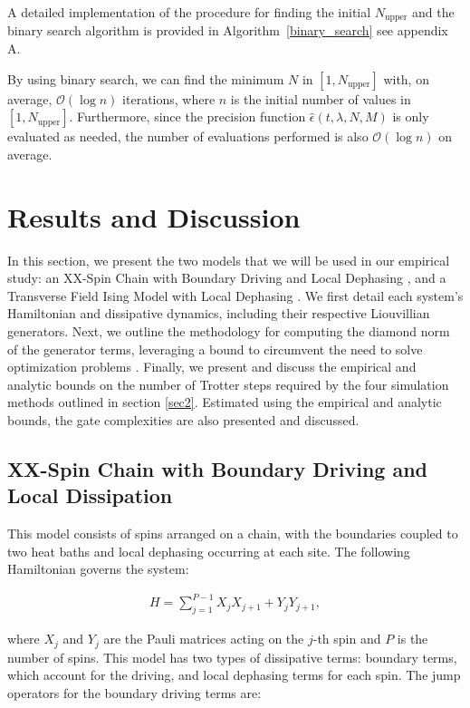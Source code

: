 \documentclass[pdflatex,sn-mathphys-num]{sn-jnl}%
\begin{document}
A detailed implementation of the procedure for finding the initial $N_{\mathrm{upper}}$ and the binary search algorithm is provided in Algorithm~\ref{binary_search} see appendix A.



By using binary search, we can find the minimum $N$ in $[1, N_{\mathrm{upper}}]$ with, on average, $\mathcal{O}(\log n)$ iterations, where $n$ is the initial number of values in $[1, N_{\mathrm{upper}}]$. Furthermore, since the precision function $\hat\epsilon(t, \lambda, N, M)$ is only evaluated as needed, the number of evaluations performed is also $\mathcal{O}(\log n)$ on average.

\section{Results and Discussion}\label{sec4}

In this section, we present the two models that we will be used in our empirical study: an XX-Spin Chain with Boundary Driving and Local Dephasing \cite{vznidarivc2015relaxation}, and a Transverse Field Ising Model with Local Dephasing \cite{hashizume2022dynamical}. We first detail each system's Hamiltonian and dissipative dynamics, including their respective Liouvillian generators. Next, we outline the methodology for computing the diamond norm of the generator terms, leveraging a bound to circumvent the need to solve optimization problems \cite{nechita2018almost}. Finally, we present and discuss the empirical and analytic bounds on the number of Trotter steps required by the four simulation methods outlined in section \ref{sec2}. Estimated using the empirical and analytic bounds, the gate complexities are also presented and discussed. 

\subsection{XX-Spin Chain with Boundary Driving and Local Dissipation}

This model consists of spins arranged on a chain, with the boundaries coupled to two heat baths and local dephasing occurring at each site. The following Hamiltonian governs the system:

\begin{align}
H=\sum_{j=1}^{P-1}X_{j}X_{j+1}+Y_{j}Y_{j+1},
\end{align}

\noindent where $X_{j}$ and $Y_{j}$ are the Pauli matrices acting on the $j$-th spin and $P$ is the number of spins. This model has two types of dissipative terms: boundary terms, which account for the driving, and local dephasing terms for each spin. The jump operators for the boundary driving terms are:
\end{document}
